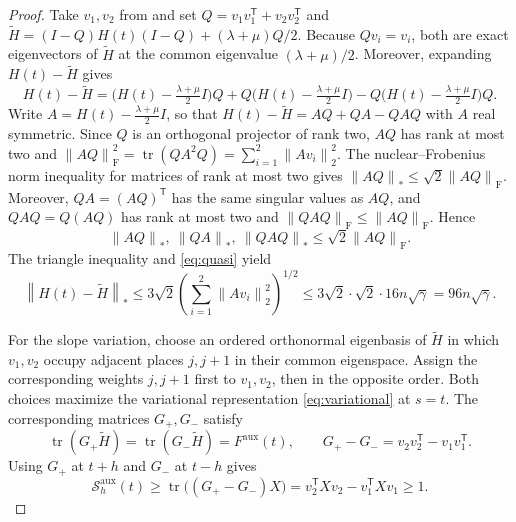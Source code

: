 \documentclass[10pt,a4paper]{article}
\newcommand{\norm}[1]{\left\lVert #1\right\rVert}
\DeclareMathOperator{\tr}{tr}
\begin{document}
\begin{proof}
Take $v_1,v_2$ from  and set
$Q=v_1v_1^{\mathsf T}+v_2v_2^{\mathsf T}$ and
$\widetilde H=(I-Q)H(t)(I-Q)+(\lambda+\mu)Q/2$.
Because $Qv_i=v_i$, both are exact eigenvectors of
$\widetilde H$ at the common eigenvalue $(\lambda+\mu)/2$.
Moreover, expanding $H(t)-\widetilde H$ gives
\[
H(t)-\widetilde H
=\bigl(H(t)-\tfrac{\lambda+\mu}{2}I\bigr)Q
+Q\bigl(H(t)-\tfrac{\lambda+\mu}{2}I\bigr)
-Q\bigl(H(t)-\tfrac{\lambda+\mu}{2}I\bigr)Q.
\]
Write $A=H(t)-\tfrac{\lambda+\mu}{2}I$, so that
$H(t)-\widetilde H=AQ+QA-QAQ$ with $A$ real symmetric.
Since $Q$ is an orthogonal projector of rank two, $AQ$ has
rank at most two and
$\norm{AQ}_{\mathrm F}^2=\tr(QA^2Q)
=\sum_{i=1}^2\norm{Av_i}_2^2$.
The nuclear--Frobenius norm inequality for matrices of rank
at most two gives $\norm{AQ}_*\leq\sqrt2\norm{AQ}_{\mathrm F}$.
Moreover, $QA=(AQ)^{\mathsf T}$ has the same singular values
as $AQ$, and $QAQ=Q(AQ)$ has rank at most two and
$\norm{QAQ}_{\mathrm F}\leq\norm{AQ}_{\mathrm F}$. Hence
\[
\norm{AQ}_*,\ \norm{QA}_*,\ \norm{QAQ}_*
\leq\sqrt2\norm{AQ}_{\mathrm F}.
\]
The triangle inequality and \eqref{eq:quasi} yield
\[
\norm{H(t)-\widetilde H}_*
\leq3\sqrt2\left(\sum_{i=1}^2
\norm{Av_i}_2^2
\right)^{1/2}
\leq3\sqrt2\cdot\sqrt2\cdot16n\sqrt\gamma
=96n\sqrt\gamma.
\]

For the slope variation, choose an ordered orthonormal eigenbasis
of $\widetilde H$ in which $v_1,v_2$ occupy adjacent places
$j,j+1$ in their common eigenspace. Assign the corresponding
weights $j,j+1$ first to $v_1,v_2$, then in the opposite order.
Both choices maximize the variational representation
\eqref{eq:variational} at $s=t$. The corresponding matrices
$G_+,G_-$ satisfy
\[
\tr(G_+\widetilde H)=\tr(G_-\widetilde H)=F^{\mathrm{aux}}(t),
\qquad G_+-G_-=v_2v_2^{\mathsf T}-v_1v_1^{\mathsf T}.
\]
Using $G_+$ at $t+h$ and $G_-$ at $t-h$ gives
\[
\mathcal S_h^{\mathrm{aux}}(t)
\geq\tr\bigl((G_+-G_-)X\bigr)
=v_2^{\mathsf T}Xv_2-v_1^{\mathsf T}Xv_1\geq1.
\]
\end{proof}
\end{document}
